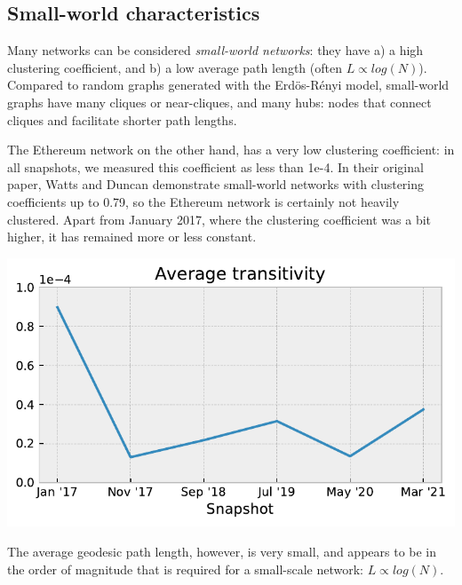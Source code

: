 \documentclass[10pt,a4paper]{article}
\newenvironment{Figure}
  {\par\medskip\noindent\minipage{\linewidth}}
  {\endminipage\par\medskip}
\begin{document}
\begin{multicols}{2}
\subsection{Small-world characteristics}
Many networks can be considered \textit{small-world networks}: they have a) a high clustering coefficient, and b) a low average path length \cite{WattsDuncanJ1998Cdos} (often $L \propto log(N)$). Compared to random graphs generated with the Erd\"{o}s-R\'{e}nyi model, small-world graphs have many cliques or near-cliques, and many hubs: nodes that connect cliques and facilitate shorter path lengths.

The Ethereum network on the other hand, has a very low clustering coefficient: in all snapshots, we measured this coefficient as less than 1e-4. In their original paper, Watts and Duncan demonstrate small-world networks with clustering coefficients up to 0.79, so the Ethereum network is certainly not heavily clustered. Apart from January 2017, where the clustering coefficient was a bit higher, it has remained more or less constant. 

\begin{Figure}
\centering
\includegraphics[scale=0.55]{figures/transitivity.pdf}
\end{Figure}

The average geodesic path length, however, is very small, and appears to be in the order of magnitude that is required for a small-scale network: $L \propto log(N)$. 


\end{multicols}
\end{document}
